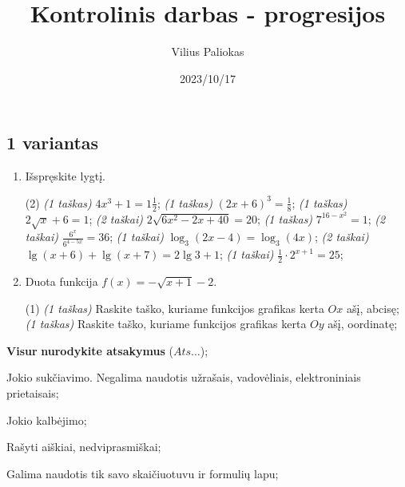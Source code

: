 \documentclass[a4paper]{article}
\title{Kontrolinis darbas - progresijos}
\author{Vilius Paliokas}
\date{2023/10/17}
\begin{document}
\thispagestyle{fancy}

\titlespacing*{\subsection}{0pt}{.75ex}{0.75ex}

\subsection*{1 variantas}

\begin{enumerate}
      \item Išspręskite lygtį.

            \begin{tasks}[item-format={\normalfont}, after-item-skip=2mm](2)
                  \task \textit{(1 taškas)} $4x^3+1=1\frac{1}{2}$;
                  \task \textit{(1 taškas)} $(2x+6)^3=\frac{1}{8}$;
                  \task \textit{(1 taškas)} $2\sqrt{x}+6=1$;
                  \task \textit{(2 taškai)} $2\sqrt{6x^2-2x+40}=20$;
                  \task \textit{(1 taškas)} $7^{16-x^2}=1$;
                  \task \textit{(2 taškai)} $\frac{6^x}{6^{4-5x}}=36$;
                  \task \textit{(1 taškai)} $\log_3(2x-4)=\log_3(4x)$;
                  \task \textit{(2 taškai)} $\lg(x+6)+\lg(x+7)=2\lg3+1$;
                  \task \textit{(1 taškai)} $\frac{1}{2}\cdot 2^{x+1}=25$;
            \end{tasks}

      \item Duota funkcija $f(x)=-\sqrt{x+1}-2$.
            \begin{tasks}[item-format={\normalfont}, after-item-skip=2mm](1)
                  \task \textit{(1 taškas)} Raskite taško, kuriame funkcijos grafikas kerta $Ox$ ašį, abcisę;
                  \task \textit{(1 taškas)} Raskite taško, kuriame funkcijos grafikas kerta $Oy$ ašį, oordinatę;
            \end{tasks}
\end{enumerate}

\begin{small}
      \begin{enumerate*}[label={(\arabic*)}]
            \item \textbf{Visur} \textbf{nurodykite atsakymus} ($Ats\ldots$);
            \item Jokio sukčiavimo. Negalima naudotis užrašais, vadovėliais,
            elektroniniais prietaisais;
            \item Jokio kalbėjimo;
            \item Rašyti aiškiai, nedviprasmiškai;
            \item Galima naudotis tik savo skaičiuotuvu ir formulių lapu;
      \end{enumerate*}
\end{small}
\end{document}
